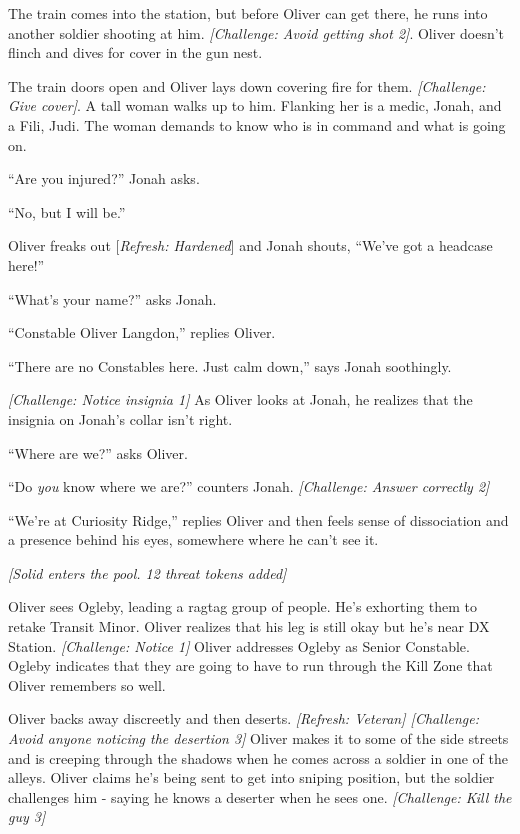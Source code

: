 The train comes into the station, but before Oliver can get there, he runs into another soldier shooting at him. \textit{{[}Challenge: Avoid getting shot 2{]}}.  Oliver doesn't flinch and dives for cover in the gun nest.



The train doors open and Oliver lays down covering fire for them. \textit{{[}Challenge: Give cover{]}}.  A tall woman walks up to him.  Flanking her is a medic, Jonah, and a Fili, Judi.  The woman demands to know who is in command and what is going on.

``Are you injured?'' Jonah asks.

``No, but I will be.''



Oliver freaks out {[}\textit{Refresh: Hardened}{]} and Jonah shouts, ``We've got a headcase here!''

``What's your name?'' asks Jonah.

``Constable Oliver Langdon,'' replies Oliver.

``There are no Constables here.  Just calm down,'' says Jonah soothingly.



\textit{{[}Challenge: Notice insignia 1{]}}  As Oliver looks at Jonah, he realizes that the insignia on Jonah's collar isn't right.

``Where are we?'' asks Oliver. 

``Do \textit{you }know where we are?'' counters Jonah.  \textit{{[}Challenge: Answer correctly 2{]}}

``We're at Curiosity Ridge,'' replies Oliver and then feels sense of dissociation and a presence behind his eyes, somewhere where he can't see it.



\textit{{[}Solid enters the pool.  12 threat tokens added{]}}



Oliver sees Ogleby, leading a ragtag group of people.  He's exhorting them to retake Transit Minor.  Oliver realizes that his leg is still okay but he's near DX Station.  \textit{{[}Challenge: Notice 1{]}}  Oliver addresses Ogleby as Senior Constable.  Ogleby indicates that they are going to have to run through the Kill Zone that Oliver remembers so well.



Oliver backs away discreetly and then deserts. \textit{{[}Refresh: Veteran{]} {[}Challenge: Avoid anyone noticing the desertion 3{]}} Oliver makes it to some of the side streets and is creeping through the shadows when he comes across a soldier in one of the alleys.  Oliver claims he's being sent to get into sniping position, but the soldier challenges him - saying he knows a deserter when he sees one. \textit{{[}Challenge: Kill the guy 3{]}}



